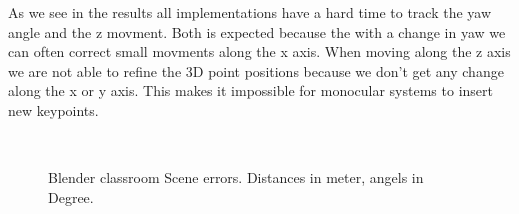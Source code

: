 \documentclass[11pt,a4paper,titlepage,oneside]{report}
\begin{document}
As we see in the results all implementations have a hard time to track the yaw angle and the z movment. Both is expected because the with a change in yaw we can often correct small movments along the x axis. When moving along the z axis we are not able to refine the 3D point positions because we don't get any change along the x or y axis. This makes it impossible for monocular systems to insert new keypoints.

\begin{figure}[H]
  \\
  \caption{Blender classroom Scene errors. Distances in meter, angels in Degree.}\label{fig:blender_classroom_simple_diff}
\end{figure}
\end{document}
